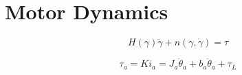 \documentclass[12pt]{report}
\begin{document}
\normalem

{\tableofcontents\let\clearpage\relax\listoffigures\let\clearpage\relax\listoftables}
\clearpage
\newpage




% 
\section{Motor Dynamics}
\begin{equation}
  H(\gamma)\ddot{\gamma} + n(\gamma,\dot{\gamma}) = \tau
  \label{eq:rdyn}
\end{equation}

\begin{equation}
  \tau_a = Ki_a = J_a\ddot{\theta}_a + b_a\ddot{\theta}_a + \tau_L
  \label{eq:pd}
\end{equation}
\end{document}
